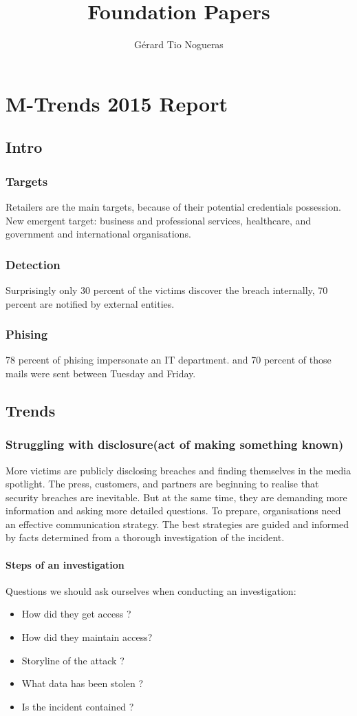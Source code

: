 \documentclass[10pt,a4paper]{report}
\author{Gérard Tio Nogueras}
\title{Foundation Papers}
\begin{document}
\chapter{M-Trends 2015 Report}
\section{Intro}
\subsection{Targets}
Retailers are the main targets, because of their potential credentials possession.\\
New emergent target:  business and professional services, healthcare, and government and international organisations.\\
\subsection{Detection}
Surprisingly only 30 percent of the victims discover the breach internally, 70 percent are notified by external entities.
\subsection{Phising}
78 percent of phising impersonate an IT department. and 70 percent of those mails were sent between Tuesday and Friday.
\section{Trends}
\subsection{Struggling with disclosure(act of making something known)}
 More victims are publicly disclosing breaches and finding 
themselves in the media spotlight. The press, customers, and partners are 
beginning to realise that security breaches are inevitable. But at the same time, they are demanding more information and asking more detailed questions. To prepare, organisations need an effective communication strategy. The best 
strategies are guided and informed by facts determined from a thorough 
investigation of the incident.
\subsubsection{Steps of an investigation}
Questions we should ask ourselves when conducting an investigation:\\
\begin{itemize}
\item How did they get access ?
\item How did they maintain access?
\item Storyline of the attack ?
\item What data has been stolen ?
\item Is the incident contained ?
\end{itemize}
\end{document}

